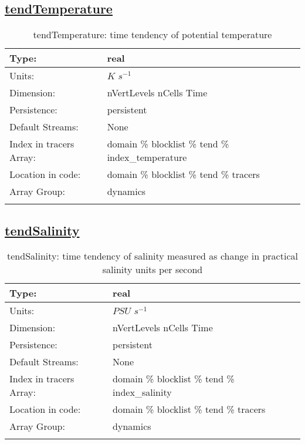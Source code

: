 \subsection[tendTemperature]{\hyperref[sec:var_tab_tend]{tendTemperature}}
\label{subsec:var_sec_tend_tendTemperature}
\begin{center}
\begin{longtable}{| p{2.0in} | p{4.0in} |}
        \hline 
        Type: & real \\
        \hline 
        Units: & $K$ $s^{-1}$ \\
        \hline 
        Dimension: & nVertLevels nCells Time \\
        \hline 
        Persistence: & persistent \\
        \hline 
		 Default Streams: & None \\
        \hline 
		 Index in tracers Array: & domain \% blocklist \% tend \% index\_temperature \\
		 \hline 
		 Location in code: & domain \% blocklist \% tend \% tracers \\
		 \hline 
		 Array Group: & dynamics \\
		 \hline 
    \caption{tendTemperature: time tendency of potential temperature}
\end{longtable}
\end{center}
\subsection[tendSalinity]{\hyperref[sec:var_tab_tend]{tendSalinity}}
\label{subsec:var_sec_tend_tendSalinity}
\begin{center}
\begin{longtable}{| p{2.0in} | p{4.0in} |}
        \hline 
        Type: & real \\
        \hline 
        Units: & $PSU$ $s^{-1}$ \\
        \hline 
        Dimension: & nVertLevels nCells Time \\
        \hline 
        Persistence: & persistent \\
        \hline 
		 Default Streams: & None \\
        \hline 
		 Index in tracers Array: & domain \% blocklist \% tend \% index\_salinity \\
		 \hline 
		 Location in code: & domain \% blocklist \% tend \% tracers \\
		 \hline 
		 Array Group: & dynamics \\
		 \hline 
    \caption{tendSalinity: time tendency of salinity measured as change in practical salinity units per second}
\end{longtable}
\end{center}

